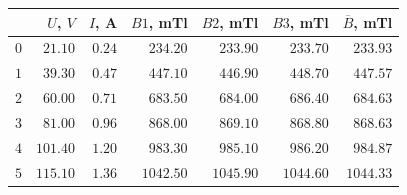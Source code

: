 \documentclass[a4paper, 12pt]{article}
\begin{document}
\begin{tabular}{|r|r|r|r|r|r|r|}
    \toprule
     & $U$, $V$ & $I$, A & $B1$, mTl & $B2$, mTl & $B3$, mTl & $\overline{B}$, mTl \\
    \midrule
    $0$ & $21.10$  & $0.24$ & $234.20$  & $233.90$  & $233.70$  & $233.93$  \\
    $1$ & $39.30$  & $0.47$ & $447.10$  & $446.90$  & $448.70$  & $447.57$  \\
    $2$ & $60.00$  & $0.71$ & $683.50$  & $684.00$  & $686.40$  & $684.63$  \\
    $3$ & $81.00$  & $0.96$ & $868.00$  & $869.10$  & $868.80$  & $868.63$  \\
    $4$ & $101.40$ & $1.20$ & $983.30$  & $985.10$  & $986.20$  & $984.87$  \\
    $5$ & $115.10$ & $1.36$ & $1042.50$ & $1045.90$ & $1044.60$ & $1044.33$ \\
    \bottomrule
\end{tabular}
\end{document}
